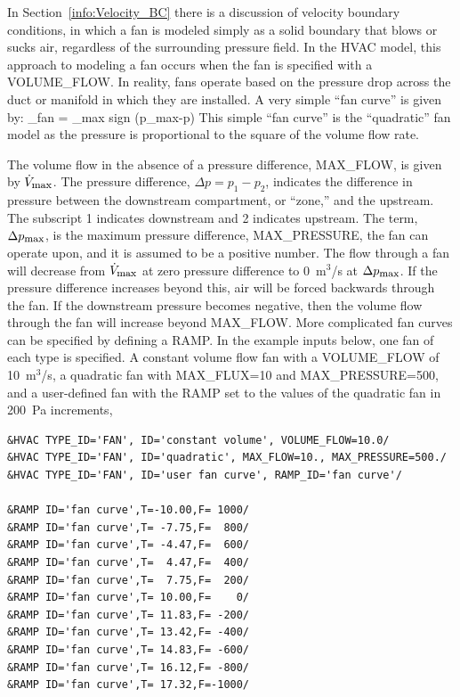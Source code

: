 \documentclass[11pt]{book}
\begin{document}
In Section~\ref{info:Velocity_BC} there is a discussion of velocity boundary conditions,
in which a fan is modeled simply as a solid boundary that blows or
sucks air, regardless of the surrounding pressure field. In the HVAC model, this approach to modeling a fan occurs when the fan is specified with a {\ct VOLUME\_FLOW}.
In reality, fans operate based on
the pressure drop across the duct or manifold in which they are
installed. A very simple ``fan curve'' is given by:
\be {}_{\hbox{\footnotesize fan}} = _{\hbox{\footnotesize max}} \;
   \hbox{sign} (\Delta p_{\hbox{\footnotesize max}}-\Delta p)
     \label{fan_curve} \ee
This simple ``fan curve'' is the ``quadratic'' fan model as the pressure is proportional to the square of the volume flow rate.

The volume flow in the absence of a pressure difference, {\ct MAX\_FLOW}, is given by $\dot{V}_{\hbox{\footnotesize max}}$.  The pressure difference, $\Delta p=p_1-p_2$, indicates the difference in
pressure between the downstream compartment, or ``zone,'' and the upstream. The subscript 1 indicates downstream and 2 indicates upstream.
The term, $\Delta p_{\hbox{\footnotesize max}}$, is the maximum
pressure difference, {\ct MAX\_PRESSURE}, the fan can operate upon, and it is assumed to be a positive number.
The flow through a fan will decrease from $\dot{V}_{\hbox{\footnotesize max}}$ at zero pressure difference to 0~m$^3$/s at $\Delta p_{\hbox{\footnotesize max}}$.
If the pressure difference increases beyond this, air will be forced backwards through the fan.   If the downstream pressure becomes negative, then the volume flow through the fan will increase beyond {\ct MAX\_FLOW}. More complicated fan curves can be specified by defining a {\ct RAMP}.  In the example inputs below, one fan of each type is specified.  A constant volume flow fan with a {\ct VOLUME\_FLOW} of 10~m$^3$/s, a quadratic fan with {\ct MAX\_FLUX=10} and {\ct MAX\_PRESSURE=500}, and a user-defined fan with the {\ct RAMP} set to the values of the quadratic fan in 200~Pa increments,

\begin{lstlisting}
&HVAC TYPE_ID='FAN', ID='constant volume', VOLUME_FLOW=10.0/
&HVAC TYPE_ID='FAN', ID='quadratic', MAX_FLOW=10., MAX_PRESSURE=500./
&HVAC TYPE_ID='FAN', ID='user fan curve', RAMP_ID='fan curve'/

&RAMP ID='fan curve',T=-10.00,F= 1000/
&RAMP ID='fan curve',T= -7.75,F=  800/
&RAMP ID='fan curve',T= -4.47,F=  600/
&RAMP ID='fan curve',T=  4.47,F=  400/
&RAMP ID='fan curve',T=  7.75,F=  200/
&RAMP ID='fan curve',T= 10.00,F=    0/
&RAMP ID='fan curve',T= 11.83,F= -200/
&RAMP ID='fan curve',T= 13.42,F= -400/
&RAMP ID='fan curve',T= 14.83,F= -600/
&RAMP ID='fan curve',T= 16.12,F= -800/
&RAMP ID='fan curve',T= 17.32,F=-1000/
\end{lstlisting}
\end{document}
